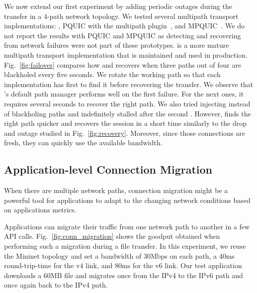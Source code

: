 We now extend our first experiment by adding periodic outages during the 
transfer in a 4-path network topology.
We tested several multipath transport implementations: \mptcp, PQUIC with the 
multipath
plugin~\cite{de2019pluginizing}, and MPQUIC~\cite{de2017multipath}.
We do not report the results with PQUIC and MPQUIC as 
detecting and recovering from network failures were not part of these 
prototypes.
\mptcp is a more mature multipath transport implementation that is maintained 
and used in production. Fig.~\ref{fig:failover} compares how 
\mptcp and \tcpls recovers when three paths out of four are blackholed every 
five seconds. We rotate the working path so that each implementation has 
first to find it before recovering the transfer. 
We observe that \mptcp's default path manager performs well on the first
failure. For the next ones, it requires several seconds to recover the right 
path. 
We also tried injecting \tcp \rst instead of blackholing paths and \mptcp 
indefinitely stalled after the second \rst.
However, \tcpls finds the right path quicker and recovers the session in a 
short time similarly to the drop and \rst outage studied in 
Fig.~\ref{fig:recovery}. Moreover, since those connections are fresh, they can 
quickly use the available bandwidth.

\subsection{Application-level Connection Migration}
\label{sec:app-migration}

When there are multiple network paths, connection migration might be a
powerful tool for applications to adapt to the changing network conditions 
based on applications metrics.

Applications can migrate their traffic from 
one network path to another in a few \tcpls API calls. 
Fig.~\ref{fig:conn_migration} shows the goodput 
obtained when performing such a migration during a file transfer.%
In this experiment, we reuse the Mininet topology %
and set a bandwidth of 30Mbps on each path, a 40ms 
round-trip-time for the v4 link, and 80ms for the v6 link. Our test application 
downloads a 60MB file and migrates once from the IPv4 to 
the IPv6 path and once again back to the IPv4 path.

